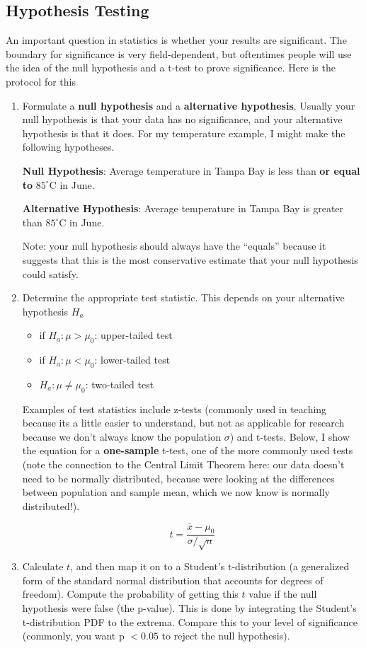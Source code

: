 \documentclass{article}
\begin{document}
\subsection{Hypothesis Testing}
An important question in statistics is whether your results are significant. The boundary for significance is very field-dependent, but oftentimes people will use the idea of the null hypothesis and a t-test to prove significance. Here is the protocol for this
\begin{enumerate}
\item\label{item:4} Formulate a \textbf{null hypothesis} and a \textbf{alternative hypothesis}. Usually your null hypothesis is that your data has no significance, and your alternative hypothesis is that it does. For my temperature example, I might make the following hypotheses.

  \textbf{Null Hypothesis}: Average temperature in Tampa Bay is less than \textbf{or equal to} $85^{\circ}$C in June.

  \textbf{Alternative Hypothesis}: Average temperature in Tampa Bay is greater than $85^{\circ}$C in June.

  Note: your null hypothesis should always have the ``equals'' because it suggests that this is the most conservative estimate that your null hypothesis could satisfy.
  
\item Determine the appropriate test statistic. This depends on your alternative hypothesis $H_a$

\begin{itemize}
\item if $H_a:\mu>\mu_0$: upper-tailed test
\item if $H_a:\mu<\mu_0$: lower-tailed test
\item $H_a:\mu\neq\mu_0$: two-tailed test
\end{itemize}


Examples of test statistics include z-tests (commonly used in teaching because its a little easier to understand, but not as applicable for research because we don't always know the population $\sigma$) and t-tests. Below, I show the equation for a \textbf{one-sample} t-test, one of the more commonly used tests (note the connection to the Central Limit Theorem here: our data doesn't need to be normally distributed, because were looking at the differences between population and sample mean, which we now know is normally distributed!). 

\begin{equation}
\label{eq:15}
t = \frac{\bar{x}-\mu_0}{\sigma / \sqrt{n}}
\end{equation}

\item Calculate $t$, and then map it on to a Student's t-distribution (a generalized form of the standard normal distribution that accounts for degrees of freedom). Compute the probability of getting this $t$ value if the null hypothesis were false (the p-value). This is done by integrating the Student's t-distribution PDF to the extrema. Compare this to your level of significance (commonly, you want p $< 0.05$ to reject the null hypothesis).
 
\end{enumerate}  
\end{document}
